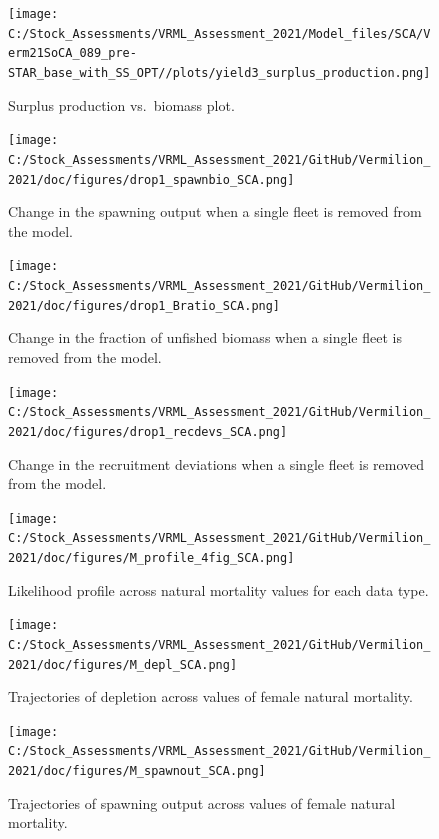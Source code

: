 \documentclass[
  english,
  a4paper,
]{article}
\begin{document}
\begin{figure}
\centering
\texttt{[image: C:/Stock\_Assessments/VRML\_Assessment\_2021/Model\_files/SCA/Verm21SoCA\_089\_pre-STAR\_base\_with\_SS\_OPT//plots/yield3\_surplus\_production.png]}
\caption{Surplus production vs.~biomass plot.\label{fig:yield3}}
\end{figure}

\FloatBarrier

\begin{figure}
\centering
\texttt{[image: C:/Stock\_Assessments/VRML\_Assessment\_2021/GitHub/Vermilion\_2021/doc/figures/drop1\_spawnbio\_SCA.png]}
\caption{Change in the spawning output when a single fleet is removed from the model.\label{fig:drop-spawnbio}}
\end{figure}

\begin{figure}
\centering
\texttt{[image: C:/Stock\_Assessments/VRML\_Assessment\_2021/GitHub/Vermilion\_2021/doc/figures/drop1\_Bratio\_SCA.png]}
\caption{Change in the fraction of unfished biomass when a single fleet is removed from the model.\label{fig:drop-bratio}}
\end{figure}

\begin{figure}
\centering
\texttt{[image: C:/Stock\_Assessments/VRML\_Assessment\_2021/GitHub/Vermilion\_2021/doc/figures/drop1\_recdevs\_SCA.png]}
\caption{Change in the recruitment deviations when a single fleet is removed from the model.\label{fig:drop-recdev}}
\end{figure}

\begin{figure}
\centering
\texttt{[image: C:/Stock\_Assessments/VRML\_Assessment\_2021/GitHub/Vermilion\_2021/doc/figures/M\_profile\_4fig\_SCA.png]}
\caption{Likelihood profile across natural mortality values for each data type.\label{fig:m-profile}}
\end{figure}

\begin{figure}
\centering
\texttt{[image: C:/Stock\_Assessments/VRML\_Assessment\_2021/GitHub/Vermilion\_2021/doc/figures/M\_depl\_SCA.png]}
\caption{Trajectories of depletion across values of female natural mortality.\label{fig:m-depl}}
\end{figure}

\begin{figure}
\centering
\texttt{[image: C:/Stock\_Assessments/VRML\_Assessment\_2021/GitHub/Vermilion\_2021/doc/figures/M\_spawnout\_SCA.png]}
\caption{Trajectories of spawning output across values of female natural mortality.\label{fig:m-spawn}}
\end{figure}
\end{document}
